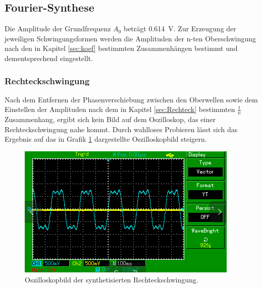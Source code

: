 \subsection{Fourier-Synthese}
Die Amplitude der Grundfrequenz $A_0$ beträgt \SI{0.614}{\volt}. Zur Erzeugung der jeweiligen
Schwingungsformen werden die Amplituden der n-ten Oberschwingung nach den in Kapitel \ref{sec:koef}
bestimmten Zusammenhängen bestimmt und dementsprechend eingestellt.
\subsubsection{Rechteckschwingung}
Nach dem Entfernen der Phasenverschiebung zwischen den Oberwellen sowie dem Einstellen
der Amplituden nach dem in Kapitel \ref{sec:Rechteck} bestimmten $\frac{1}{n}$ Zusammenhang,
ergibt sich kein Bild auf dem Oszilloskop, das einer Rechteckschwingung nahe kommt.
Durch wahlloses Probieren lässt sich das Ergebnis auf das in Grafik \ref{abb:1} dargestellte
Oszilloskopbild steigern.
\begin{figure}
  \centering
  \includegraphics[scale=0.4]{Rechteck.png}
  \caption{Oszilloskopbild der synthetisierten Rechteckschwingung.}
  \label{abb:1}
\end{figure}

